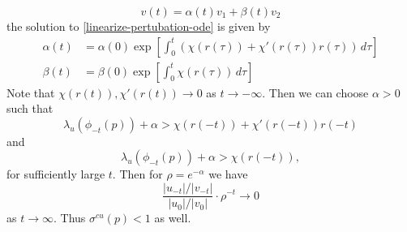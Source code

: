 \begin{equation*}
	v(t) = \alpha (t) v_1 + \beta(t) v_2
\end{equation*}
the solution to \cref{linearize-pertubation-ode} is given by 
\begin{equation*}
	\begin{aligned}
		\alpha(t) &= \alpha(0) \exp\left[ \int_0^t (\chi(r(\tau)) + \chi'(r(\tau))r(\tau) )\, d\tau\right]\\
		\beta(t) &= \beta(0)\exp\left[\int_0^t \chi(r(\tau))\, d\tau\right]
	\end{aligned}
\end{equation*}
Note that \(\chi(r(t)) ,\chi'(r(t)) \to 0\) as \(t\to-\infty\). Then we can choose \(\alpha > 0\) such that
\begin{equation*}
	\lambda_u(\phi_{-t}(p)) + \alpha > \chi(r(-t)) + \chi'(r(-t))r(-t)
\end{equation*}
and 
\begin{equation*}
	\lambda_u(\phi_{-t}(p)) + \alpha > \chi(r(-t)),
\end{equation*}
for sufficiently large \(t\). Then for \(\rho = e^{-\alpha}\) we have
\begin{equation*}
	\frac{|u_{-t}|/|v_{-t}|}{|u_0|/|v_0|} \cdot \rho^{-t} \to 0
\end{equation*}
as \(t\to\infty\). Thus \(\sigma^{cu}(p) < 1\) as well.